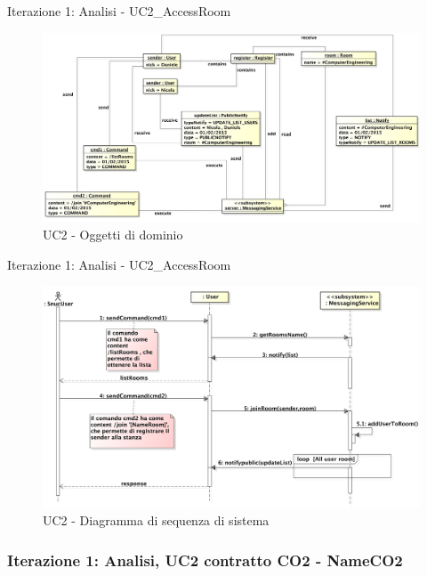 \documentclass[t]{beamer} %
\begin{document}
\begin{frame} {Iterazione 1: Analisi - UC2\_AccessRoom}
   \begin{figure}
     \includegraphics[scale=0.26]{image_astah/Iteration_1_DomainModel/UC2_AccessRoom_OM}{\centering}
     \caption{UC2 - Oggetti di dominio}
     \label{fig_UC2_AR_OM} 
   \end{figure}
\end{frame}

\begin{frame} {Iterazione 1: Analisi - UC2\_AccessRoom}
   \begin{figure}
     \includegraphics[scale=0.25]{image_astah/Iteration_1_DomainModel/UC2_AccessRoom_SSD.png}{\centering}
     \caption{UC2 - Diagramma di sequenza di sistema}
     \label{fig_UC2_AR_SSD} 
   \end{figure}
\end{frame}

\begin{frame}
 \frametitle{Iterazione 1: Analisi, UC2 contratto CO2 - NameCO2}
  \begin{table}[!htbp]
   \caption {UC2 Contratto CO2 - NameCO2}
    \label{table:1}
   \end{table}
\end{frame}
\end{document}
